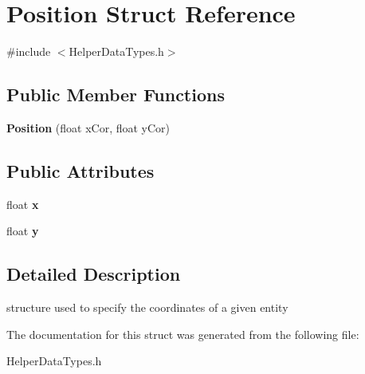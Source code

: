 \hypertarget{struct_position}{}\section{Position Struct Reference}
\label{struct_position}


{\ttfamily \#include $<$Helper\+Data\+Types.\+h$>$}

\subsection*{Public Member Functions}
\begin{DoxyCompactItemize}
\item 
\mbox{\label{struct_position_a2846e4a9e095a0f98f5be27936af63db}} 
{\bfseries Position} (float x\+Cor, float y\+Cor)
\end{DoxyCompactItemize}
\subsection*{Public Attributes}
\begin{DoxyCompactItemize}
\item 
\mbox{\label{struct_position_af684446cbf0f6d53386686283da6dcc6}} 
float {\bfseries x}
\item 
\mbox{\label{struct_position_a54a6182b5f7539295b32255808897d3f}} 
float {\bfseries y}
\end{DoxyCompactItemize}


\subsection{Detailed Description}
structure used to specify the coordinates of a given entity 

The documentation for this struct was generated from the following file\+:\begin{DoxyCompactItemize}
\item 
Helper\+Data\+Types.\+h\end{DoxyCompactItemize}
